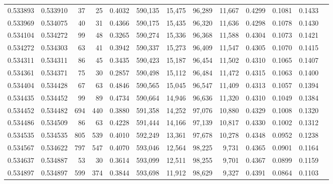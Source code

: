 \begin{tabular}{rrrrrrrrrrrrr}
0.533893 & 0.533910 &    37 &    25 &                                     0.4032 & 590,135 &  15,475 &  96,289 &  11,667 & 0.4299 & 0.1081 & 0.1433 \\
0.533969 & 0.534075 &    40 &    31 &                                     0.4366 & 590,175 &  15,435 &  96,320 &  11,636 & 0.4298 & 0.1078 & 0.1430 \\
0.534104 & 0.534272 &    99 &    48 &                                     0.3265 & 590,274 &  15,336 &  96,368 &  11,588 & 0.4304 & 0.1073 & 0.1421 \\
0.534272 & 0.534303 &    63 &    41 &                                     0.3942 & 590,337 &  15,273 &  96,409 &  11,547 & 0.4305 & 0.1070 & 0.1415 \\
0.534311 & 0.534311 &    86 &    45 &                                     0.3435 & 590,423 &  15,187 &  96,454 &  11,502 & 0.4310 & 0.1065 & 0.1407 \\
0.534361 & 0.534371 &    75 &    30 &                                     0.2857 & 590,498 &  15,112 &  96,484 &  11,472 & 0.4315 & 0.1063 & 0.1400 \\
0.534404 & 0.534428 &    67 &    63 &                                     0.4846 & 590,565 &  15,045 &  96,547 &  11,409 & 0.4313 & 0.1057 & 0.1394 \\
0.534435 & 0.534452 &    99 &    89 &                                     0.4734 & 590,664 &  14,946 &  96,636 &  11,320 & 0.4310 & 0.1049 & 0.1384 \\
0.534452 & 0.534482 &   694 &   440 &                                     0.3880 & 591,358 &  14,252 &  97,076 &  10,880 & 0.4329 & 0.1008 & 0.1320 \\
0.534486 & 0.534509 &    86 &    63 &                                     0.4228 & 591,444 &  14,166 &  97,139 &  10,817 & 0.4330 & 0.1002 & 0.1312 \\
0.534535 & 0.534535 &   805 &   539 &                                     0.4010 & 592,249 &  13,361 &  97,678 &  10,278 & 0.4348 & 0.0952 & 0.1238 \\
0.534567 & 0.534622 &   797 &   547 &                                     0.4070 & 593,046 &  12,564 &  98,225 &   9,731 & 0.4365 & 0.0901 & 0.1164 \\
0.534637 & 0.534887 &    53 &    30 &                                     0.3614 & 593,099 &  12,511 &  98,255 &   9,701 & 0.4367 & 0.0899 & 0.1159 \\
0.534897 & 0.534897 &   599 &   374 &                                     0.3844 & 593,698 &  11,912 &  98,629 &   9,327 & 0.4391 & 0.0864 & 0.1103 \\

\end{tabular}
